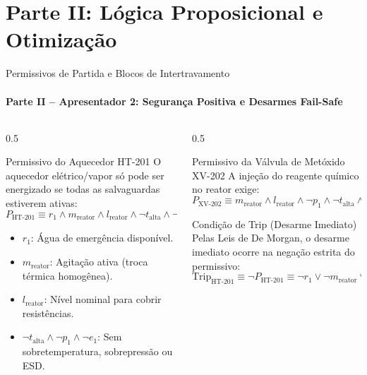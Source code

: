 \documentclass[aspectratio=169, 10pt]{beamer}
\begin{document}
\section{Parte II: Lógica Proposicional e Otimização}

\begin{frame}{Permissivos de Partida e Blocos de Intertravamento}
  \framesubtitle{Parte II -- Apresentador 2: Segurança Positiva e Desarmes Fail-Safe}
  \begin{columns}
    \begin{column}{0.5\textwidth}
      \begin{block}{Permissivo do Aquecedor HT-201}
        O aquecedor elétrico/vapor só pode ser energizado se todas as salvaguardas estiverem ativas:
        $$P_{\text{HT-201}} \equiv r_1 \land m_{\text{reator}} \land l_{\text{reator}} \land \neg t_{\text{alta}} \land \neg p_1 \land \neg e_1$$
        \begin{itemize}
          \item $r_1$: Água de emergência disponível.
          \item $m_{\text{reator}}$: Agitação ativa (troca térmica homogênea).
          \item $l_{\text{reator}}$: Nível nominal para cobrir resistências.
          \item $\neg t_{\text{alta}} \land \neg p_1 \land \neg e_1$: Sem sobretemperatura, sobrepressão ou ESD.
        \end{itemize}
      \end{block}
    \end{column}

    \begin{column}{0.5\textwidth}
      \begin{block}{Permissivo da Válvula de Metóxido XV-202}
        A injeção do reagente químico no reator exige:
        $$P_{\text{XV-202}} \equiv m_{\text{reator}} \land l_{\text{reator}} \land \neg p_1 \land \neg t_{\text{alta}} \land \neg l_{\text{alto}} \land \neg g_{\text{alm}} \land \neg e_1$$
      \end{block}

      \begin{alertblock}{Condição de Trip (Desarme Imediato)}
        Pelas Leis de De Morgan, o desarme imediato ocorre na negação estrita do permissivo:
        $$\text{Trip}_{\text{HT-201}} \equiv \neg P_{\text{HT-201}} \equiv \neg r_1 \lor \neg m_{\text{reator}} \lor \neg l_{\text{reator}} \lor t_{\text{alta}} \lor p_1 \lor e_1$$
      \end{alertblock}
    \end{column}
  \end{columns}
\end{frame}
\end{document}
